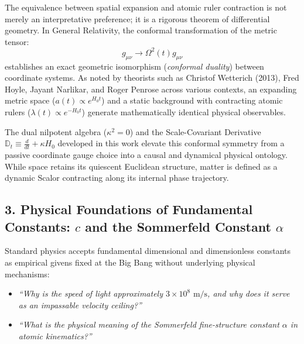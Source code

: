 The equivalence between spatial expansion and atomic ruler contraction is not merely an interpretative preference; it is a rigorous theorem of differential geometry. In General Relativity, the conformal transformation of the metric tensor:
\begin{equation}
    g_{\mu\nu} \to \Omega^2(t) g_{\mu\nu}
\end{equation}
establishes an exact geometric isomorphism (\textit{conformal duality}) between coordinate systems. As noted by theorists such as Christof Wetterich (2013), Fred Hoyle, Jayant Narlikar, and Roger Penrose across various contexts, an expanding metric space ($a(t) \propto e^{H_0 t}$) and a static background with contracting atomic rulers ($\lambda(t) \propto e^{-H_0 t}$) generate mathematically identical physical observables.

The dual nilpotent algebra ($\kappa^2 = 0$) and the Scale-Covariant Derivative $\mathbb{D}_t \equiv \frac{d}{dt} + \kappa H_0$ developed in this work elevate this conformal symmetry from a passive coordinate gauge choice into a causal and dynamical physical ontology. While space retains its quiescent Euclidean structure, matter is defined as a dynamic Scalor contracting along its internal phase trajectory.

\subsection*{3. Physical Foundations of Fundamental Constants: $c$ and the Sommerfeld Constant $\alpha$}

Standard physics accepts fundamental dimensional and dimensionless constants as empirical givens fixed at the Big Bang without underlying physical mechanisms:
\begin{itemize}
    \item \textit{``Why is the speed of light approximately $3 \times 10^8\text{ m/s}$, and why does it serve as an impassable velocity ceiling?''}
    \item \textit{``What is the physical meaning of the Sommerfeld fine-structure constant $\alpha$ in atomic kinematics?''}
\end{itemize}

